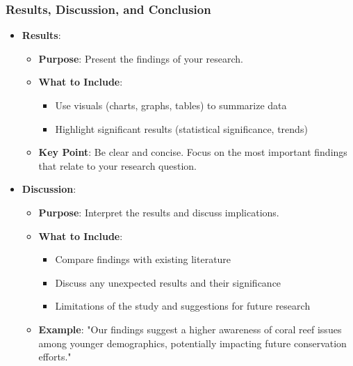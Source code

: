 \documentclass[aspectratio=169]{beamer}
\begin{document}
\begin{frame}[fragile]
    \frametitle{Results, Discussion, and Conclusion}
    \begin{itemize}
        \item \textbf{Results}:
        \begin{itemize}
            \item \textbf{Purpose}: Present the findings of your research.
            \item \textbf{What to Include}:
            \begin{itemize}
                \item Use visuals (charts, graphs, tables) to summarize data
                \item Highlight significant results (statistical significance, trends)
            \end{itemize}
            \item \textbf{Key Point}: Be clear and concise. Focus on the most important findings that relate to your research question.
        \end{itemize}

        \item \textbf{Discussion}:
        \begin{itemize}
            \item \textbf{Purpose}: Interpret the results and discuss implications.
            \item \textbf{What to Include}:
            \begin{itemize}
                \item Compare findings with existing literature
                \item Discuss any unexpected results and their significance
                \item Limitations of the study and suggestions for future research
            \end{itemize}
            \item \textbf{Example}: "Our findings suggest a higher awareness of coral reef issues among younger demographics, potentially impacting future conservation efforts."
        \end{itemize}
        

\end{itemize}
\end{frame}
\end{document}
